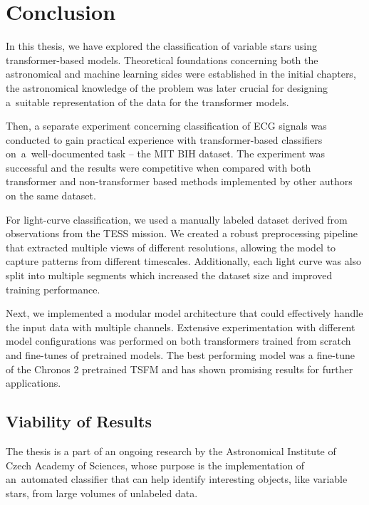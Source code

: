 \chapter{Conclusion}

In this thesis, we have explored the classification of variable stars using \linebreak transformer-based models.
Theoretical foundations concerning both the astronomical and machine learning sides were established in the initial chapters, the astronomical knowledge of the problem was later crucial for designing a~suitable representation of the data for the transformer models.

Then, a separate experiment concerning classification of ECG signals was conducted to gain practical experience with transformer-based classifiers \linebreak on~a~well-documented task -- the MIT BIH dataset.
The experiment was successful and the results were competitive when compared with both transformer and non-transformer based methods implemented by other authors on the same dataset.

For light-curve classification, we used a manually labeled dataset derived from observations from the TESS mission.
We created a robust preprocessing pipeline that extracted multiple views of different resolutions, allowing the model to capture patterns from different timescales.
Additionally, each light curve was also split into multiple segments which increased the dataset size and improved training performance.

Next, we implemented a modular model architecture that could effectively handle the input data with multiple channels.
Extensive experimentation with different model configurations was performed on both transformers trained from scratch and fine-tunes of pretrained models.
The best performing model was a fine-tune of the Chronos 2 pretrained TSFM and has shown promising results for further applications.

\section{Viability of Results}

The thesis is a part of an ongoing research by the Astronomical Institute of Czech Academy of Sciences, whose purpose is the implementation of an~automated classifier that can help identify interesting objects, like variable stars, from large volumes of unlabeled data.

